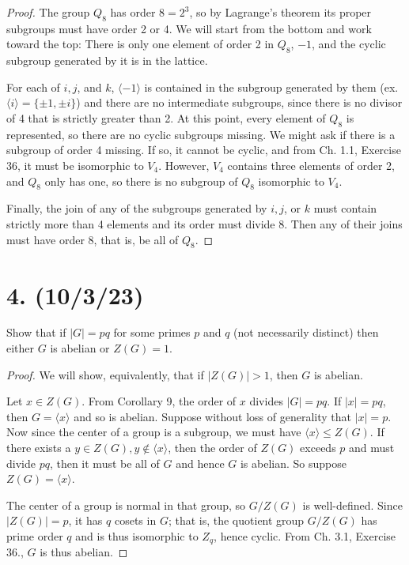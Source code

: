 \documentclass{article}
\begin{document}
\begin{proof}
    The group $Q_8$ has order $8 = 2^3$, so by Lagrange's theorem its proper subgroups must have order 2 or 4. We will start from the bottom and work toward the top: There is only one element of order 2 in $Q_8$, $-1$, and the cyclic subgroup generated by it is in the lattice.

    For each of $i, j$, and $k$, $\langle -1 \rangle$ is contained in the subgroup generated by them (ex. $\langle i \rangle = \{ \pm{1}, \pm{i} \}$) and there are no intermediate subgroups, since there is no divisor of 4 that is strictly greater than 2. At this point, every element of $Q_8$ is represented, so there are no cyclic subgroups missing. We might ask if there is a subgroup of order 4 missing. If so, it cannot be cyclic, and from Ch. 1.1, Exercise 36, it must be isomorphic to $V_4$. However, $V_4$ contains three elements of order 2, and $Q_8$ only has one, so there is no subgroup of $Q_8$ isomorphic to $V_4$.

    Finally, the join of any of the subgroups generated by $i, j$, or $k$ must contain strictly more than 4 elements and its order must divide 8. Then any of their joins must have order 8, that is, be all of $Q_8$.
\end{proof}

\section*{4. (10/3/23)}

Show that if $|G| = pq$ for some primes $p$ and $q$ (not necessarily distinct) then either $G$ is abelian or $Z(G) = 1$.

\begin{proof}
    We will show, equivalently, that if $|Z(G)| > 1$, then $G$ is abelian.
    
    Let $x \in Z(G)$. From Corollary 9, the order of $x$ divides $|G| = pq$. If $|x| = pq$, then $G = \langle x \rangle$ and so is abelian. Suppose without loss of generality that $|x| = p$. Now since the center of a group is a subgroup, we must have $\langle x \rangle \leq Z(G)$. If there exists a $y \in Z(G), y \notin \langle x \rangle$, then the order of $Z(G)$ exceeds $p$ and must divide $pq$, then it must be all of $G$ and hence $G$ is abelian. So suppose $Z(G) = \langle x \rangle$.
    
    The center of a group is normal in that group, so $G/Z(G)$ is well-defined. Since $|Z(G)| = p$, it has $q$ cosets in $G$; that is, the quotient group $G/Z(G)$ has prime order $q$ and is thus isomorphic to $Z_q$, hence cyclic. From Ch. 3.1, Exercise 36., $G$ is thus abelian.
\end{proof}
\end{document}

